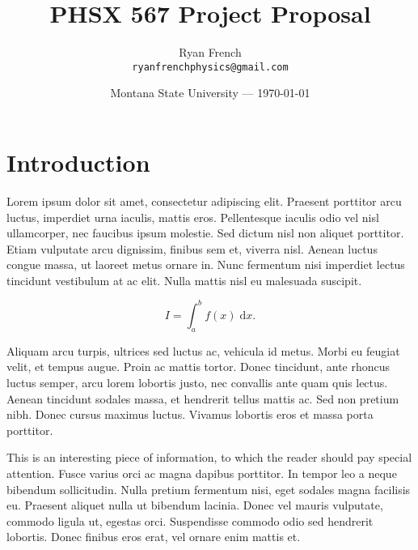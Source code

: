 \documentclass{article}
\title{PHSX 567 Project Proposal} %
\author{Ryan French\\ \texttt{ryanfrenchphysics@gmail.com}} %
\date{Montana State University --- \today} %
\begin{document}
\maketitle %


\section*{Introduction} %

Lorem ipsum dolor sit amet, consectetur adipiscing elit. Praesent porttitor arcu luctus, imperdiet urna iaculis, mattis eros. Pellentesque iaculis odio vel nisl ullamcorper, nec faucibus ipsum molestie. Sed dictum nisl non aliquet porttitor. Etiam vulputate arcu dignissim, finibus sem et, viverra nisl. Aenean luctus congue massa, ut laoreet metus ornare in. Nunc fermentum nisi imperdiet lectus tincidunt vestibulum at ac elit. Nulla mattis nisl eu malesuada suscipit.

\begin{equation}
	I = \int_{a}^{b} f(x) \; \text{d}x.
\end{equation}

Aliquam arcu turpis, ultrices sed luctus ac, vehicula id metus. Morbi eu feugiat velit, et tempus augue. Proin ac mattis tortor. Donec tincidunt, ante rhoncus luctus semper, arcu lorem lobortis justo, nec convallis ante quam quis lectus. Aenean tincidunt sodales massa, et hendrerit tellus mattis ac. Sed non pretium nibh. Donec cursus maximus luctus. Vivamus lobortis eros et massa porta porttitor.

\begin{info} %
	This is an interesting piece of information, to which the reader should pay special attention. Fusce varius orci ac magna dapibus porttitor. In tempor leo a neque bibendum sollicitudin. Nulla pretium fermentum nisi, eget sodales magna facilisis eu. Praesent aliquet nulla ut bibendum lacinia. Donec vel mauris vulputate, commodo ligula ut, egestas orci. Suspendisse commodo odio sed hendrerit lobortis. Donec finibus eros erat, vel ornare enim mattis et.
\end{info}

\end{document}
